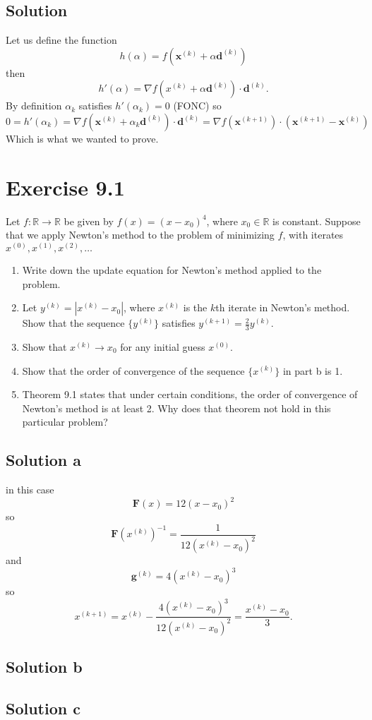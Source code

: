 \documentclass{article}
\newcommand{\bld}[1]{\boldsymbol{#1}}
\begin{document}
\subsection*{Solution}
Let us define the function
\[
	h(\alpha)=f(\bld{x}^{(k)}+\alpha\bld{d}^{(k)})
\]
then
\[
	h'(\alpha)=\nabla f(x^{(k)}+\alpha \bld{d}^{(k)}) \cdot \bld{d}^{(k)}.
\]
By definition $\alpha_k$ satisfies $h'(\alpha_k)=0$ (FONC) so
\[
	0=h'(\alpha_k)=\nabla f(\bld{x}^{(k)}+\alpha_k \bld{d}^{(k)}) \cdot
	\bld{d}^{(k)} = \nabla f(\bld{x}^{(k+1)}) \cdot
	(\bld{x}^{(k+1)}-\bld{x}^{(k)})
\]
Which is what we wanted to prove.
\section*{Exercise 9.1}
Let $f:\mathbb{R} \to \mathbb{R}$ be given by $f(x) = (x-x_0)^4$, where $x_0\in \mathbb{R}$ is constant. Suppose that we apply Newton's method to the problem of minimizing $f$, with iterates $x^{(0)},x^{(1)},x^{(2)},\dots$
\begin{enumerate}[label=\alph*.]
\item Write down the update equation for Newton's method applied to the
problem.
\item Let $y^{(k)}=|x^{(k)}-x_0|$, where $x^{(k)}$ is the $k$th iterate in
	Newton's method. Show that the sequence $\{y^{(k)}\}$ satisfies
	$y^{(k+1)}=\frac{2}{3}y^{(k)}$.
\item Show that $x^{(k)}\to x_0$ for any initial guess $x^{(0)}$.
\item Show that the order of convergence of the sequence $\{x^{(k)}\}$ in part
	b is 1.
\item Theorem 9.1 states that under certain conditions, the order of
	convergence of Newton's method is at least 2. Why does that theorem not
	hold in this particular problem?
\end{enumerate}
\subsection*{Solution a}
in this case
\[
	\bld{F}(x)=12(x-x_0)^2
\]
so
\[
	\bld{F}(x^{(k)})^{-1}=\frac{1}{12(x^{(k)}-x_0)^2}
\]
and
\[
	\bld{g}^{(k)}=4(x^{(k)}-x_0)^3
\]
so
\[
	x^{(k+1)}=x^{(k)}-\frac{4(x^{(k)}-x_0)^3}{12(x^{(k)}-x_0)^2}=\frac{x^{(k)}-x_0}{3}.
\]
\subsection*{Solution b}
\subsection*{Solution c}
\end{document}
